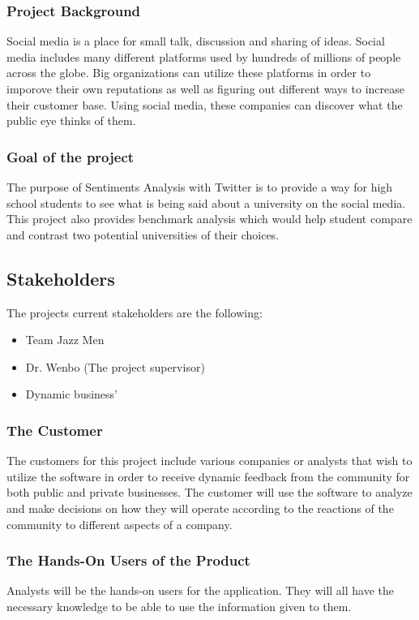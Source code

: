 \documentclass[12pt]{article}
\begin{document}
\subsubsection{Project Background}
Social media is a place for small talk, discussion and sharing of ideas. Social media includes many different platforms used by hundreds of millions of people across the globe. Big organizations can utilize these platforms in order to imporove their own reputations as well as figuring out different ways to increase their customer base. Using social media, these companies can discover what the public eye thinks of them.\\

\subsubsection{Goal of the project}
The purpose of Sentiments Analysis with Twitter is to provide a way for
high school students to see what is being said about a university on the
social media. This project also provides benchmark analysis which would
help student compare and contrast two potential universities of their choices.

\subsection{Stakeholders}\label{SubSec_Stakeholders} %
The projects current stakeholders are the following:
\begin{itemize}
\item Team Jazz Men
\item Dr. Wenbo (The project supervisor)
\item Dynamic business'
\end{itemize}
	
\subsubsection{The Customer}
The customers for this project include various companies or analysts that wish to utilize the software in order to receive dynamic feedback from the community for both public and private businesses. The customer will use the software to analyze and make decisions on how they will operate according to the reactions of the community to different aspects of a company.

\subsubsection{The Hands-On Users of the Product}
Analysts will be the hands-on users for the application. They will all have the necessary knowledge to be able to use the information given to them.
\end{document}
